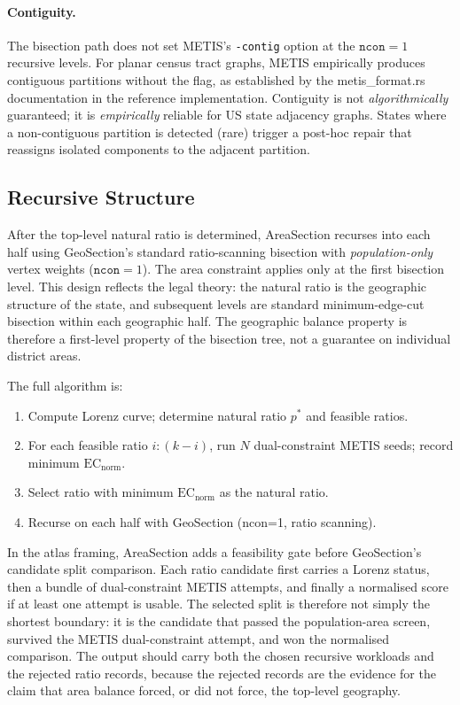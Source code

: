 \paragraph{Contiguity.}
The bisection path does not set METIS's \texttt{-contig} option at the
$\mathtt{ncon}=1$ recursive levels.
For planar census tract graphs, METIS empirically produces contiguous partitions
without the flag, as established by the metis\_format.rs documentation in the
reference implementation.
Contiguity is not \emph{algorithmically} guaranteed; it is \emph{empirically}
reliable for US state adjacency graphs.
States where a non-contiguous partition is detected (rare) trigger a post-hoc
repair that reassigns isolated components to the adjacent partition.

\subsection{Recursive Structure}

After the top-level natural ratio is determined, AreaSection recurses into
each half using GeoSection's standard ratio-scanning bisection with
\emph{population-only} vertex weights ($\mathtt{ncon}=1$).
The area constraint applies only at the first bisection level.
This design reflects the legal theory: the natural ratio is the geographic
structure of the state, and subsequent levels are standard minimum-edge-cut
bisection within each geographic half.
The geographic balance property is therefore a first-level property of the
bisection tree, not a guarantee on individual district areas.

The full algorithm is:
\begin{enumerate}
  \item Compute Lorenz curve; determine natural ratio $p^*$ and feasible ratios.
  \item For each feasible ratio $i:(k-i)$, run $N$ dual-constraint METIS seeds;
    record minimum $\mathrm{EC}_{\text{norm}}$.
  \item Select ratio with minimum $\mathrm{EC}_{\text{norm}}$ as the natural ratio.
  \item Recurse on each half with GeoSection (ncon=1, ratio scanning).
\end{enumerate}

In the atlas framing, AreaSection adds a feasibility gate before GeoSection's
candidate split comparison.
Each ratio candidate first carries a Lorenz status, then a bundle of
dual-constraint METIS attempts, and finally a normalised score if at least one
attempt is usable.
The selected split is therefore not simply the shortest boundary: it is the
candidate that passed the population-area screen, survived the METIS
dual-constraint attempt, and won the normalised comparison.
The output should carry both the chosen recursive workloads and the rejected
ratio records, because the rejected records are the evidence for the claim that
area balance forced, or did not force, the top-level geography.

